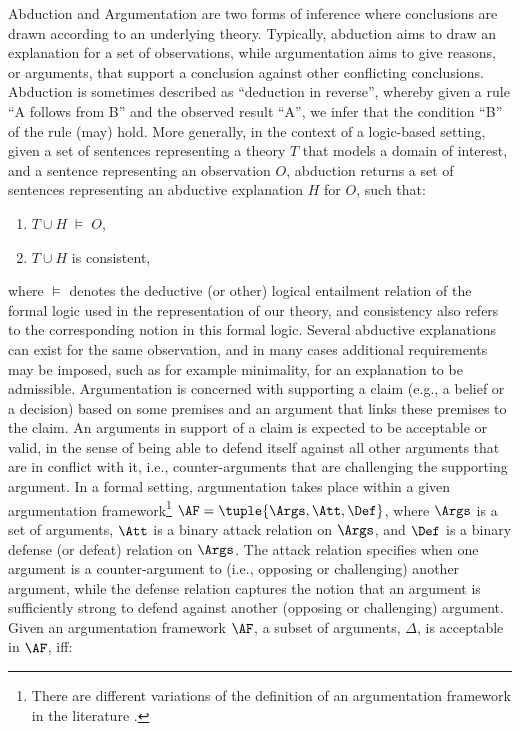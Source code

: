 

\label{Section: Introduction}
Abduction and Argumentation are two forms of inference where conclusions are drawn according to an underlying theory. Typically, abduction aims to draw an explanation for a set of observations, while argumentation aims to give reasons, or arguments, that support a conclusion against other conflicting conclusions.
Abduction is sometimes described as ``deduction in reverse'', whereby given a rule ``A follows from B'' and the observed result ``A'', we infer that the condition ``B'' of the rule (may) hold. More generally, in the context of a logic-based setting, given a set of sentences representing a theory $T$ that models a domain of interest, and a sentence representing an observation $O$, abduction returns a set of sentences representing an abductive explanation $H$ for $O$, such that:
\begin{enumerate}
\item[{1.}] $T \cup H\;\models \;O,$
\item[{2.}] $T \cup H$ is consistent,
\end{enumerate}
\noindent where $\models$ denotes the deductive (or other) logical entailment relation of the formal logic used in the representation of our theory, and consistency also refers to the corresponding notion in this formal logic. Several abductive explanations can exist for the same observation, and in many cases additional requirements may be imposed, such as for example minimality, for an explanation to be admissible.
Argumentation is concerned with supporting a claim (e.g., a belief or a decision) based on some premises and an argument that links these premises to the claim. An arguments in support of a claim is expected to be acceptable or valid, in the sense of being able to defend itself against all other arguments that are in conflict with it, i.e., counter-arguments that are challenging the supporting argument. 
In a formal setting, argumentation takes place within a given argumentation framework\footnote{There are different variations of the definition of an argumentation framework in the literature .} $\AF = \tuple{\Args, \Att, \Def}$, where $\Args$ is a set of arguments, $\Att$ is a binary attack relation on $\Args$, and $\Def$ is a binary defense (or defeat) relation on $\Args$. The attack relation specifies when one argument is a counter-argument to (i.e., opposing or challenging) another argument, while the defense relation captures the notion that an argument is sufficiently strong to defend against another (opposing or challenging) argument. Given an argumentation framework $\AF$, a subset of arguments, $\Delta$, is acceptable in $\AF$, iff:
